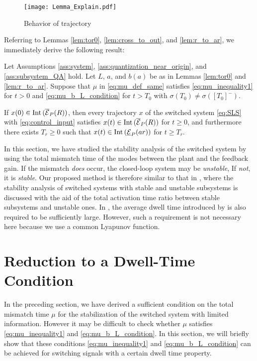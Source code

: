 \documentclass[a4, 11pt]{article}
\newcommand{\Int}{\mathop{\rm Int~\!}}
\begin{document}
 \begin{figure}[t]
 \centering
 \texttt{[image: Lemma\_Explain.pdf]}
 \caption{Behavior of trajectory}
 \label{fig:Lemma_Explain}
 \end{figure}
 
 


Referring to 
Lemmas \ref{lem:tor0}, \ref{lem:cross_to_out}, and \ref{lem:r_to_ar},
we immediately derive the following result:
\begin{theorem}
\label{thm:main_thm}
Let Assumptions \ref{ass:system}, \ref{ass:quantization_near_origin}, and
\ref{ass:subsystem_QA} hold.
Let $L$, $a$, and $b(a)$ be as in Lemmas \ref{lem:tor0} and \ref{lem:r_to_ar}.
Suppose that $\mu$ in \eqref{eq:mu_def_same} satisfies
\eqref{eq:mu_inequality1} for $t > 0$ and 
\eqref{eq:mu_b_L_condition} for $t > T_0$ with 
$\sigma(T_0) \not= \sigma([T_0]^-)$.

If $x(0) \in \Int(\overline{\mathcal{E}}_P(R))$, then
every trajectory $x$ of the switched system \eqref{eq:SLS} 
with \eqref{eq:control_input} satisfies
$x(t) \in \Int(\overline{\mathcal{E}}_P(R))$ for $t \geq 0$, and furthermore
there exists $T_{r} \geq 0$ such that 
$x(t) \in \Int(\underline{\mathcal{E}}_P(ar))$ 
for $t \geq T_{r}$.
\end{theorem}

\begin{remark}
In this section, we have studied the stability analysis of the switched system
by using the total mismatch time of the modes 
between the plant and the feedback gain.
If the mismatch {\em does} occur, 
the closed-loop system may be {\em unstable},
If {\em not}, it is {\em stable}.
Our proposed method is therefore similar to that in \cite{Zhai2001}, where
the stability analysis of switched systems with stable and unstable subsystems 
is discussed with the aid of 
the total activation time ratio between stable subsystems and unstable ones.
In \cite{Zhai2001}, the average dwell time
introduced by \cite{Hespanha1999CDC}
is also required to be sufficiently large.
However, such a requirement is not necessary here because we use a common Lyapunov function.
\end{remark}






\section{Reduction to a Dwell-Time Condition}
In the preceding section, we have derived a sufficient condition 
on the total mismatch time $\mu$ for the stabilization of
the switched system with limited information.
However it may be difficult to check whether $\mu$ satisfies
\eqref{eq:mu_inequality1} and \eqref{eq:mu_b_L_condition}.
In this section, we will briefly show that these conditions \eqref{eq:mu_inequality1} and \eqref{eq:mu_b_L_condition}
can be achieved for
switching signals with a certain dwell time property.
\end{document}
